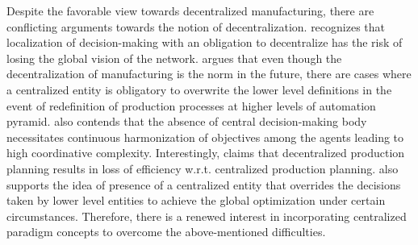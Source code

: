\documentclass[10pt,conference,compsocconf]{IEEEtran}
\begin{document}
Despite the favorable view towards decentralized manufacturing, there are conflicting arguments towards the notion of decentralization. \cite{Montreuil_Frayret:2000:A_strategic} recognizes that localization of decision-making with an obligation to decentralize has the risk of losing the global vision of the network. \cite{Marquesa_Agostinho:2017:Decentralized_decision} argues that even though the decentralization of manufacturing is the norm in the future, there are cases where a centralized entity is obligatory to overwrite the lower level definitions in the event of redefinition of production processes at higher levels of automation pyramid. \cite{Mourtzis_Doukas:2012:Decentralized_manufacturing} also contends that the absence of central decision-making body necessitates continuous harmonization of objectives among the agents leading to high coordinative complexity. Interestingly, \cite{Saharidis_Dallery:2006:Centralized_versus} claims that decentralized production planning results in loss of efficiency w.r.t. centralized production planning. \cite{Hubanks:1998:Self_organizing} also supports the idea of presence of a centralized entity that overrides the decisions taken by lower level entities to achieve the global optimization under certain circumstances. Therefore, there is a renewed interest in incorporating centralized paradigm concepts to overcome the above-mentioned difficulties.
\end{document}
